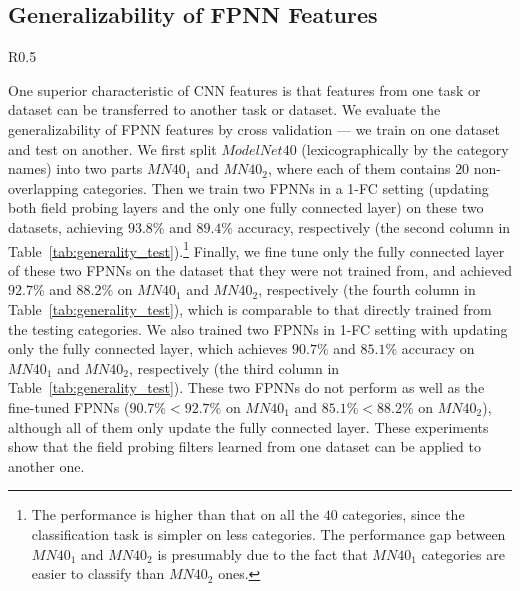 \documentclass{article}
\begin{document}
\subsection{Generalizability of FPNN Features}
\begin{wraptable}{R}{0.5\linewidth}
\vspace{-2.1cm}
\begin{center}
\end{center}
\vspace{-0.3cm}
\caption{Generalizability test of FPNN features.}
\label{tab:generality_test}
\vspace{-0.4cm}
\end{wraptable}
One superior characteristic of CNN features is that features from one task or dataset can be transferred to another task or dataset. We evaluate the generalizability of FPNN features by cross validation --- we train on one dataset and test on another. We first split ${ModelNet40}$ (lexicographically by the category names) into two parts ${MN40}_1$ and ${MN40}_2$, where each of them contains $20$ non-overlapping categories. Then we train two FPNNs in a 1-FC setting (updating both field probing layers and the only one fully connected layer) on these two datasets, achieving $93.8\%$ and $89.4\%$ accuracy, respectively (the second column in Table~\ref{tab:generality_test}).\footnote{The performance is higher than that on all the $40$ categories, since the classification task is simpler on less categories. The performance gap between ${MN40}_1$ and ${MN40}_2$ is presumably due to the fact that ${MN40}_1$ categories are easier to classify than ${MN40}_2$ ones.} Finally, we fine tune only the fully connected layer of these two FPNNs on the dataset that they were not trained from, and achieved $92.7\%$ and $88.2\%$ on ${MN40}_1$ and ${MN40}_2$, respectively (the fourth column in Table~\ref{tab:generality_test}), which is comparable to that directly trained from the testing categories. We also trained two FPNNs in 1-FC setting with updating only the fully connected layer, which achieves $90.7\%$ and $85.1\%$ accuracy on ${MN40}_1$ and ${MN40}_2$, respectively (the third column in Table~\ref{tab:generality_test}). These two FPNNs do not perform as well as the fine-tuned FPNNs ($90.7\% < 92.7\%$ on ${MN40}_1$ and $85.1\% < 88.2\%$ on ${MN40}_2$), although all of them only update the fully connected layer. These experiments show that the field probing filters learned from one dataset can be applied to another one. 
\end{document}
